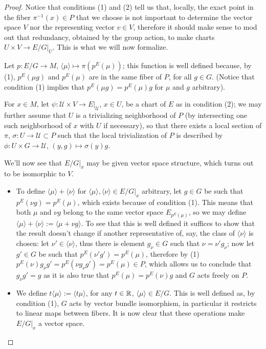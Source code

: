 \begin{proof}
Notice that conditions (1) and (2) tell us that, locally, the exact point in the fiber $\pi^{-1}(x) \in P$ that we choose is not important to determine the vector space $V$ nor the representing vector $v \in V$, therefore it should make sense to mod out that redundancy, obtained by the group action, to make charts $U \times V \to E/G|_U$. This is what we will now formalize.

Let $p: E/G \to M$, $\langle \mu \rangle \mapsto \pi(p^E(\mu))$; this function is well defined because, by (1), $p^E(\mu g)$ and $p^E(\mu)$ are in the same fiber of $P$, for all $g \in G$. (Notice that condition (1) implies that $p^E(\mu g) = p^E(\mu) g$ for $\mu$ and $g$ arbitrary).

For $x \in M$, let $\psi: \mathcal U \times V \to E|_{\mathcal U}$, $x \in U$, be a chart of $E$ as in condition (2); we may further assume that $U$ is a trivializing neighborhood of $P$ (by intersecting one such neighborhood of $x$ with $U$ if necessary), so that there exists a local section of $\pi$, $\sigma: U \to \mathcal U \subset P$ such that the local trivialization of $P$ is described by $\phi: U\times G \to \mathcal U$, $(y, g) \mapsto \sigma(y)g$.

We'll now see that $E/G|_x$ may be given vector space structure, which turns out to be isomorphic to $V$. 
\begin{itemize}
    \item To define $\langle \mu \rangle + \langle \nu \rangle$ for $\langle \mu \rangle, \langle \nu \rangle \in E/G|_x$ arbitrary, let $g \in G$ be such that $p^E(\nu g) = p^E(\mu)$, which exists because of condition (1). This means that both $\mu$ and $\nu g$ belong to the same vector space $E_{p^E(\mu)}$, so we may define $\langle \mu \rangle + \langle \nu \rangle := \langle \mu + \nu g \rangle$. To see that this is well defined it suffices to show that the result doesn't change if another representative of, say, the class of $\langle \nu \rangle$ is chosen: let $\nu' \in \langle \nu \rangle$, thus there is element $g_\nu \in G$ such that $\nu = \nu' g_\nu$; now let $g' \in G$ be such that $p^E(\nu' g') = p^E(\mu)$, therefore by (1) $p^E(\nu) g_\nu g' = p^E(\nu g_\nu g') = p^E(\mu) \in P$, which allows us to conclude that $g_\nu g' = g$ as it is also true that $p^E(\mu) = p^E(\nu)g$ and $G$ acts freely on $P$.
    
    \item We define $t\langle\mu\rangle := \langle t \mu\rangle$, for any $t \in \mathbb{R}$, $\langle\mu\rangle \in E/G$. This is well defined as, by condition (1), $G$ acts by vector bundle isomorphism, in particular it restricts to linear maps between fibers. It is now clear that these operations make $E/G|_x$ a vector space.
    

\end{itemize}
\end{proof}

